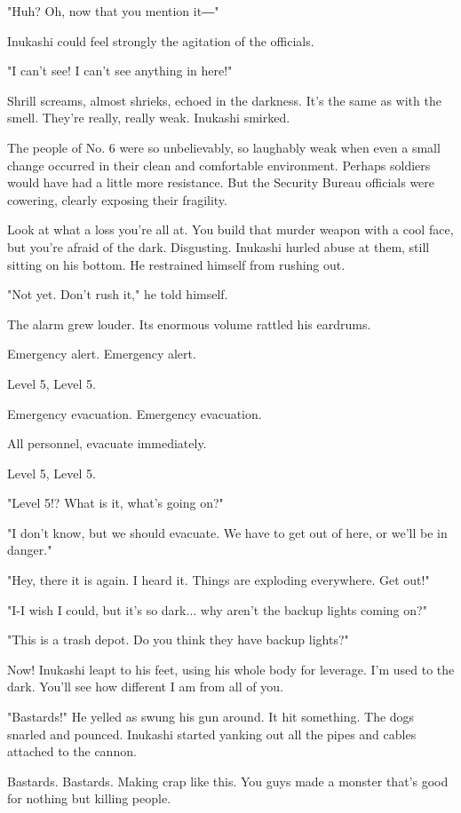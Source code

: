 "Huh? Oh, now that you mention it―"

Inukashi could feel strongly the agitation of the officials.

"I can't see! I can't see anything in here!"

Shrill screams, almost shrieks, echoed in the darkness. It's the same as
with the smell. They're really, really weak. Inukashi smirked.

The people of No. 6 were so unbelievably, so laughably weak when even a
small change occurred in their clean and comfortable environment.
Perhaps soldiers would have had a little more resistance. But the
Security Bureau officials were cowering, clearly exposing their
fragility.

Look at what a loss you're all at. You build that murder weapon with a
cool face, but you're afraid of the dark. Disgusting. Inukashi hurled
abuse at them, still sitting on his bottom. He restrained himself from
rushing out.

"Not yet. Don't rush it," he told himself.

The alarm grew louder. Its enormous volume rattled his eardrums.

Emergency alert. Emergency alert.

Level 5, Level 5.

Emergency evacuation. Emergency evacuation.

All personnel, evacuate immediately.

Level 5, Level 5.

"Level 5!? What is it, what's going on?"

"I don't know, but we should evacuate. We have to get out of here, or
we'll be in danger."

"Hey, there it is again. I heard it. Things are exploding everywhere.
Get out!"

"I-I wish I could, but it's so dark... why aren't the backup lights
coming on?"

"This is a trash depot. Do you think they have backup lights?"

Now! Inukashi leapt to his feet, using his whole body for leverage. I'm
used to the dark. You'll see how different I am from all of you.

"Bastards!" He yelled as swung his gun around. It hit something. The
dogs snarled and pounced. Inukashi started yanking out all the pipes and
cables attached to the cannon.

Bastards. Bastards. Making crap like this. You guys made a monster
that's good for nothing but killing people.

